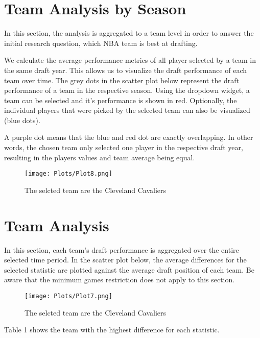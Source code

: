 \documentclass[12pt]{article}
\begin{document}
\section{Team Analysis by Season}
In this section, the analysis is aggregated to a team level in order to answer the initial research question, which NBA team is best at drafting. 

We calculate the average performance metrics of all player selected by a team in the same draft year. This allows us to visualize the draft performance of each team over time. The grey dots in the scatter plot below represent the draft performance of a team in the respective season. Using the dropdown widget, a team can be selected and it’s performance is shown in red. Optionally, the individual players that were picked by the selected team can also be visualized (blue dots).

A purple dot means that the blue and red dot are exactly overlapping. In other words, the chosen team only selected one player in the respective draft year, resulting in the players values and team average being equal.

\begin{figure}[H]
    \centering
    \texttt{[image: Plots/Plot8.png]}

    \caption{The selcted team are the Cleveland Cavaliers}
    \label{fig:3}
\end{figure}

\section{Team Analysis}
In this section, each team's draft performance is aggregated over the entire selected time period. In the scatter plot below, the average differences for the selected statistic are plotted against the average draft position of each team. Be aware that the minimum games restriction does not apply to this section.

\begin{figure}[H]
    \centering
    \texttt{[image: Plots/Plot7.png]}

    \caption{The selcted team are the Cleveland Cavaliers}
    \label{fig:7}
\end{figure}

Table 1 shows the team with the highest difference for each statistic.
\end{document}
